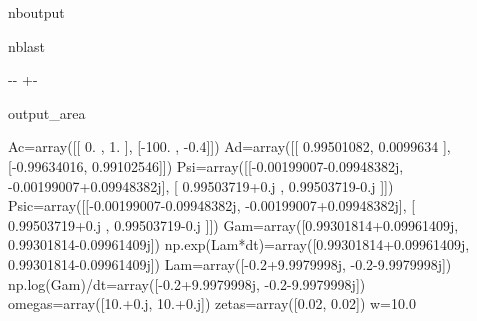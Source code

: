 \documentclass[letterpaper,10pt,english]{sphinxmanual}
\begin{document}
\begin{sphinxuseclass}{nboutput}
\begin{sphinxuseclass}{nblast}
{

\kern-\sphinxverbatimsmallskipamount\kern-\baselineskip
\kern+\FrameHeightAdjust\kern-\fboxrule
\vspace{\nbsphinxcodecellspacing}

\begin{sphinxuseclass}{output_area}
\begin{sphinxuseclass}{}


\begin{sphinxVerbatim}[commandchars=\\\{\}]
Ac=array([[   0. ,    1. ],
       [-100. ,   -0.4]])
Ad=array([[ 0.99501082,  0.0099634 ],
       [-0.99634016,  0.99102546]])
Psi=array([[-0.00199007-0.09948382j, -0.00199007+0.09948382j],
       [ 0.99503719+0.j        ,  0.99503719-0.j        ]])
Psic=array([[-0.00199007-0.09948382j, -0.00199007+0.09948382j],
       [ 0.99503719+0.j        ,  0.99503719-0.j        ]])
Gam=array([0.99301814+0.09961409j, 0.99301814-0.09961409j])
np.exp(Lam*dt)=array([0.99301814+0.09961409j, 0.99301814-0.09961409j])
Lam=array([-0.2+9.9979998j, -0.2-9.9979998j])
np.log(Gam)/dt=array([-0.2+9.9979998j, -0.2-9.9979998j])
omegas=array([10.+0.j, 10.+0.j])
zetas=array([0.02, 0.02])
w=10.0
\end{sphinxVerbatim}



\end{sphinxuseclass}
\end{sphinxuseclass}
}

\end{sphinxuseclass}
\end{sphinxuseclass}
\end{document}
